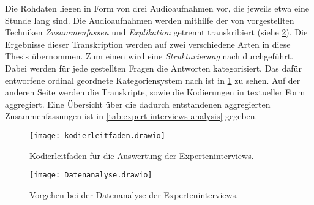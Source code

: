 Die Rohdaten liegen in Form von drei Audioaufnahmen vor, die jeweils etwa eine Stunde lang sind.
Die Audioaufnahmen werden mithilfe der von  vorgestellten Techniken  \emph{Zusammenfassen} und \emph{Explikation} getrennt transkribiert (siehe \cref{fig:datenanalyse}).
Die Ergebnisse dieser Transkription werden auf zwei verschiedene Arten in diese Thesis übernommen.
Zum einen wird eine \emph{Strukturierung} nach  durchgeführt.
Dabei werden für jede gestellten Fragen die Antworten kategorisiert.
Das dafür entworfene \glqq ordinal geordnete Kategoriensystem\grqq{} nach  ist in \cref{fig:kodierleitfaden} zu sehen.
Auf der anderen Seite werden die Transkripte, sowie die Kodierungen in textueller Form aggregiert.
Eine Übersicht über die dadurch entstandenen aggregierten Zusammenfassungen ist in \cref{tab:expert-interviews-analysis} gegeben.

\begin{figure}[!ht]
	\centering
	\texttt{[image: kodierleitfaden.drawio]}
	\caption[Kodierleitfaden Auswertung Experteninterviews]{
		Kodierleitfaden für die Auswertung der Experteninterviews.
	}
	\label{fig:kodierleitfaden}
\end{figure}

\begin{figure}[!h]
	\centering
	\texttt{[image: Datenanalyse.drawio]}
	\caption[Vorgehen Datenanalyse Experteninterviews]{
		Vorgehen bei der Datenanalyse der Experteninterviews.
	}
	\label{fig:datenanalyse}
\end{figure}






